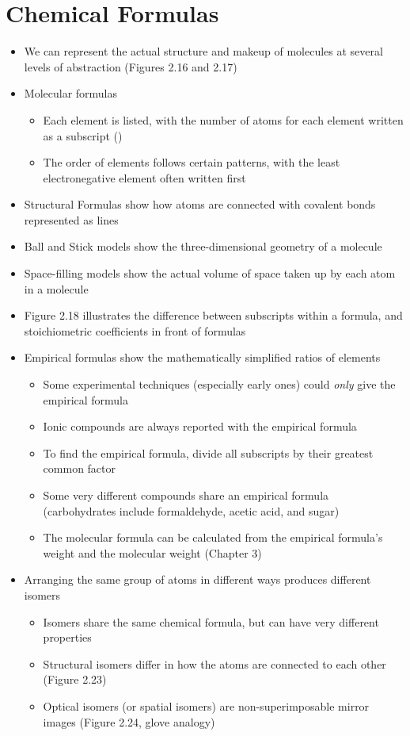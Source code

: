 \documentclass[12pt, openany, letterpaper]{memoir}
\begin{document}
\section{Chemical Formulas}
\begin{itemize}
  \item We can represent the actual structure and makeup of molecules at several levels of abstraction (Figures 2.16 and 2.17)
  \item Molecular formulas
  \begin{itemize}
    \item Each element is listed, with the number of atoms for each element written as a subscript ()
    \item The order of elements follows certain patterns, with the least electronegative element often written first
  \end{itemize}
  \item Structural Formulas show how atoms are connected with covalent bonds represented as lines
  \item Ball and Stick models show the three-dimensional geometry of a molecule
  \item Space-filling models show the actual volume of space taken up by each atom in a molecule
  \item Figure 2.18 illustrates the difference between subscripts within a formula, and stoichiometric coefficients in front of formulas
  \item Empirical formulas show the mathematically simplified ratios of elements
  \begin{itemize}
    \item Some experimental techniques (especially early ones) could \emph{only} give the empirical formula
    \item Ionic compounds are always reported with the empirical formula
    \item To find the empirical formula, divide all subscripts by their greatest common factor
    \item Some very different compounds share an empirical formula (carbohydrates  include formaldehyde, acetic acid, and sugar)
    \item The molecular formula can be calculated from the empirical formula's weight and the molecular weight (Chapter 3)
  \end{itemize}
  \item Arranging the same group of atoms in different ways produces different isomers
    \begin{itemize}
      \item Isomers share the same chemical formula, but can have very different properties
      \item Structural isomers differ in how the atoms are connected to each other (Figure 2.23)
      \item Optical isomers (or spatial isomers) are non-superimposable mirror images (Figure 2.24, glove analogy)
    \end{itemize}
\end{itemize}
\end{document}
